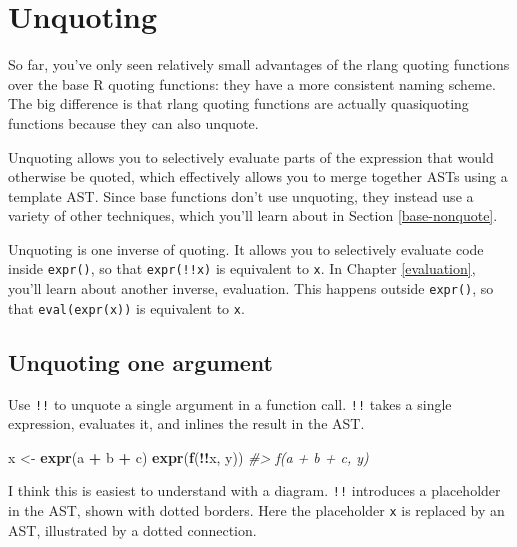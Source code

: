 \documentclass[]{book}
\makeatletter
\newenvironment{Shaded}{\begin{snugshade}}{\end{snugshade}}
\newcommand{\CommentTok}[1]{\textcolor[rgb]{0.37,0.37,0.37}{\textit{#1}}}
\newcommand{\KeywordTok}[1]{\textcolor[rgb]{0.27,0.27,0.27}{\textbf{#1}}}
\newcommand{\NormalTok}[1]{#1}
\newcommand{\OperatorTok}[1]{\textcolor[rgb]{0.43,0.43,0.43}{\textbf{#1}}}
\newcommand{\StringTok}[1]{\textcolor[rgb]{0.5,0.5,0.5}{#1}}
\newcommand{\indexc}[1]{\index{#1@\texttt{#1}}}
\makeatother
\begin{document}
\hypertarget{unquoting}{%
\section{Unquoting}\label{unquoting}}


So far, you've only seen relatively small advantages of the rlang quoting functions over the base R quoting functions: they have a more consistent naming scheme. The big difference is that rlang quoting functions are actually quasiquoting functions because they can also unquote.

Unquoting allows you to selectively evaluate parts of the expression that would otherwise be quoted, which effectively allows you to merge together ASTs using a template AST. Since base functions don't use unquoting, they instead use a variety of other techniques, which you'll learn about in Section \ref{base-nonquote}.

Unquoting is one inverse of quoting. It allows you to selectively evaluate code inside \texttt{expr()}, so that \texttt{expr(!!x)} is equivalent to \texttt{x}. In Chapter \ref{evaluation}, you'll learn about another inverse, evaluation. This happens outside \texttt{expr()}, so that \texttt{eval(expr(x))} is equivalent to \texttt{x}.

\hypertarget{unquoting-one-argument}{%
\subsection{Unquoting one argument}\label{unquoting-one-argument}}

\indexc{"!"!}

Use \texttt{!!} to unquote a single argument in a function call. \texttt{!!} takes a single expression, evaluates it, and inlines the result in the AST.

\begin{Shaded}
\begin{Highlighting}[]
\NormalTok{x <-}\StringTok{ }\KeywordTok{expr}\NormalTok{(a }\OperatorTok{+}\StringTok{ }\NormalTok{b }\OperatorTok{+}\StringTok{ }\NormalTok{c)}
\KeywordTok{expr}\NormalTok{(}\KeywordTok{f}\NormalTok{(}\OperatorTok{!!}\NormalTok{x, y))}
\CommentTok{#> f(a + b + c, y)}
\end{Highlighting}
\end{Shaded}

I think this is easiest to understand with a diagram. \texttt{!!} introduces a placeholder in the AST, shown with dotted borders. Here the placeholder \texttt{x} is replaced by an AST, illustrated by a dotted connection.
\end{document}
